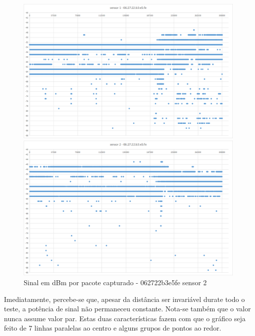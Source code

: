 \begin{figure}[htb]
\begin{minipage}{0.49\textwidth}
		\includegraphics[width=1\textwidth]{060-testes/data-analisis/night-run/062722b3e5fe-sensor-01.png}
	\end{minipage}
\hfill
	\begin{minipage}{0.49\textwidth}
	\centering
		\caption{\label{fig-062722b3e5fe-s2}Sinal em dBm por pacote capturado - 062722b3e5fe sensor 2}
		\includegraphics[width=1\textwidth]{060-testes/data-analisis/night-run/062722b3e5fe-sensor-02.png}
	\end{minipage}
\end{figure}

Imediatamente, percebe-se que, apesar da distância ser invariável durate todo o
teste, a potência de sinal
não permaneceu constante. Nota-se também que o valor
nunca assume valor par. Estas duas características fazem com que o gráfico
seja feito de 7 linhas paralelas ao centro e alguns grupos de pontos ao redor.

